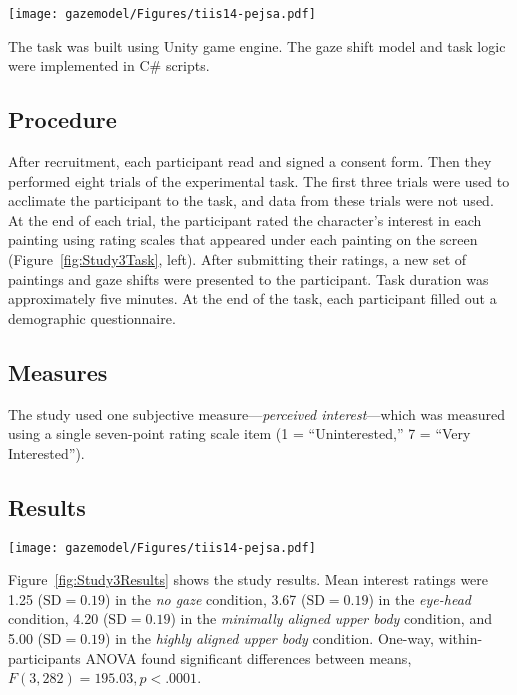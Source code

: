 \begin{figure*}
\centering
\texttt{[image: gazemodel/Figures/tiis14-pejsa.pdf]}
\caption{Experimental task in Study 3. Left: Task interface. Right: An experimenter demonstrating the task.}
\label{fig:Study3Task}
\end{figure*}

The task was built using Unity game engine. The gaze shift model and task logic were implemented in C\# scripts.

\subsection{Procedure}

After recruitment, each participant read and signed a consent form. Then they performed eight trials of the experimental task. The first three trials were used to acclimate the participant to the task, and data from these trials were not used. At the end of each trial, the participant rated the character's interest in each painting using rating scales that appeared under each painting on the screen (Figure~\ref{fig:Study3Task}, left). After submitting their ratings, a new set of paintings and gaze shifts were presented to the participant. Task duration was approximately five minutes. At the end of the task, each participant filled out a demographic questionnaire.

\subsection{Measures}

The study used one subjective measure---\emph{perceived interest}---which was measured using a single seven-point rating scale item (1 = ``Uninterested,'' 7 = ``Very Interested'').

\subsection{Results}

\begin{figure*}
\centering
\texttt{[image: gazemodel/Figures/tiis14-pejsa.pdf]}
\caption{Results for perceived interest ratings for each type of gaze shift. Results for gaze shifts with upper body movement are shown in red.}
\label{fig:Study3Results}
\end{figure*}

Figure~\ref{fig:Study3Results} shows the study results. Mean interest ratings were 1.25 ($\mathrm{SD} = 0.19$) in the \emph{no gaze} condition, 3.67 ($\mathrm{SD} = 0.19$) in the \emph{eye-head} condition, 4.20 ($\mathrm{SD} = 0.19$) in the \emph{minimally aligned upper body} condition, and 5.00 ($\mathrm{SD} = 0.19$) in the \emph{highly aligned upper body} condition. One-way, within-participants ANOVA found significant differences between means, $F(3, 282) = 195.03, p < .0001$.

